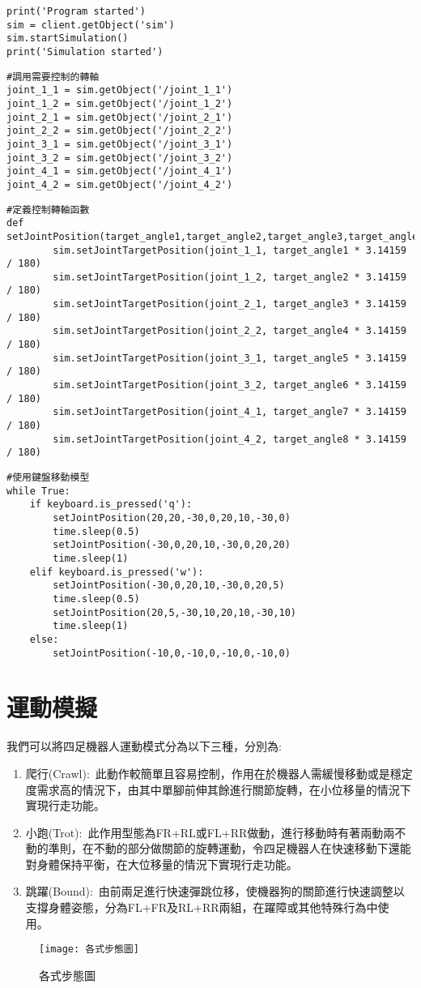 \begin{lstlisting}
print('Program started')
sim = client.getObject('sim')
sim.startSimulation()
print('Simulation started')
\end{lstlisting}
\begin{lstlisting}
#調用需要控制的轉軸
joint_1_1 = sim.getObject('/joint_1_1')
joint_1_2 = sim.getObject('/joint_1_2')
joint_2_1 = sim.getObject('/joint_2_1')
joint_2_2 = sim.getObject('/joint_2_2')
joint_3_1 = sim.getObject('/joint_3_1')
joint_3_2 = sim.getObject('/joint_3_2')
joint_4_1 = sim.getObject('/joint_4_1')
joint_4_2 = sim.getObject('/joint_4_2')
\end{lstlisting}    
\begin{lstlisting}
#定義控制轉軸函數 
def setJointPosition(target_angle1,target_angle2,target_angle3,target_angle4,target_angle5,target_angle6,target_angle7,target_angle8):
        sim.setJointTargetPosition(joint_1_1, target_angle1 * 3.14159 / 180)
        sim.setJointTargetPosition(joint_1_2, target_angle2 * 3.14159 / 180)
        sim.setJointTargetPosition(joint_2_1, target_angle3 * 3.14159 / 180)
        sim.setJointTargetPosition(joint_2_2, target_angle4 * 3.14159 / 180)
        sim.setJointTargetPosition(joint_3_1, target_angle5 * 3.14159 / 180)
        sim.setJointTargetPosition(joint_3_2, target_angle6 * 3.14159 / 180)
        sim.setJointTargetPosition(joint_4_1, target_angle7 * 3.14159 / 180)
        sim.setJointTargetPosition(joint_4_2, target_angle8 * 3.14159 / 180)
\end{lstlisting}
\begin{lstlisting}
#使用鍵盤移動模型
while True:
    if keyboard.is_pressed('q'):
        setJointPosition(20,20,-30,0,20,10,-30,0)
        time.sleep(0.5)
        setJointPosition(-30,0,20,10,-30,0,20,20)
        time.sleep(1)
    elif keyboard.is_pressed('w'):
        setJointPosition(-30,0,20,10,-30,0,20,5)
        time.sleep(0.5)
        setJointPosition(20,5,-30,10,20,10,-30,10)
        time.sleep(1)
    else:
        setJointPosition(-10,0,-10,0,-10,0,-10,0)
\end{lstlisting}

\section{運動模擬}
我們可以將四足機器人運動模式分為以下三種，分別為:\
\begin{enumerate}
\item 爬行(Crawl):\
此動作較簡單且容易控制，作用在於機器人需緩慢移動或是穩定度需求高的情況下，由其中單腳前伸其餘進行關節旋轉，在小位移量的情況下實現行走功能。\
\item 小跑(Trot):\
此作用型態為FR+RL或FL+RR做動，進行移動時有著兩動兩不動的準則，在不動的部分做關節的旋轉運動，令四足機器人在快速移動下還能對身體保持平衡，在大位移量的情況下實現行走功能。\
\item 跳躍(Bound):\
由前兩足進行快速彈跳位移，使機器狗的關節進行快速調整以支撐身體姿態，分為FL+FR及RL+RR兩組，在躍障或其他特殊行為中使用。\
\end{enumerate}
\begin{figure}[hbt!]
\center
\texttt{[image: 各式步態圖]}
\caption{\Large 各式步態圖}\label{各式步態圖}
\end{figure}

\newpage

